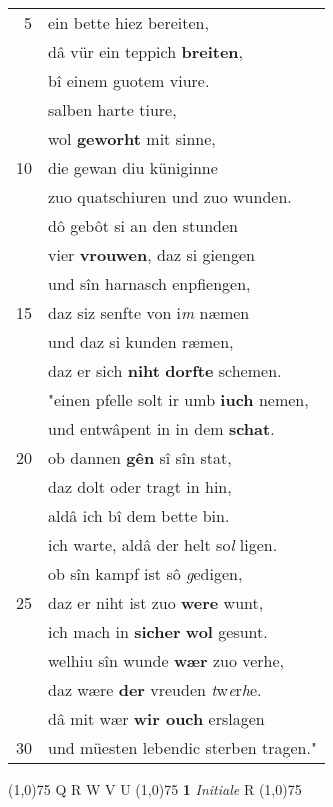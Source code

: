 \documentclass[8pt,a4paper,notitlepage]{article}
\begin{document}
\begin{table}[ht]
\begin{minipage}[t]{0.5\linewidth}
\begin{tabular}{rl}
5 & ein bette hiez bereiten,\\ 
 & dâ vür ein teppich \textbf{breiten},\\ 
 & bî einem guotem viure.\\ 
 & salben harte tiure,\\ 
 & wol \textbf{geworht} mit sinne,\\ 
10 & die gewan diu küniginne\\ 
 & zuo quatschiuren und zuo wunden.\\ 
 & dô gebôt si an den stunden\\ 
 & vier \textbf{vrouwen}, daz si giengen\\ 
 & und sîn harnasch enpfiengen,\\ 
15 & daz siz senfte von i\textit{m} næmen\\ 
 & und daz si kunden ræmen,\\ 
 & daz er sich \textbf{niht} \textbf{dorfte} schemen.\\ 
 & "einen pfelle solt ir umb \textbf{iuch} nemen,\\ 
 & und entwâpent in in dem \textbf{schat}.\\ 
20 & ob dannen \textbf{gên} sî sîn stat,\\ 
 & daz dolt oder tragt in hin,\\ 
 & aldâ ich bî dem bette bin.\\ 
 & ich warte, aldâ der helt so\textit{l} ligen.\\ 
 & ob sîn kampf ist sô \textit{g}edigen,\\ 
25 & daz er niht ist zuo \textbf{were} wunt,\\ 
 & ich mach in \textbf{sicher} \textbf{wol} gesunt.\\ 
 & welhiu sîn wunde \textbf{wær} zuo verhe,\\ 
 & daz wære \textbf{der} vreuden \textit{t}w\textit{e}r\textit{h}e.\\ 
 & dâ mit wær \textbf{wir ouch} erslagen\\ 
30 & und müesten lebendic sterben tragen."\\ 
\end{tabular}
\scriptsize
\line(1,0){75} \newline
Q R W V U \newline
\line(1,0){75} \newline
\textbf{1} \textit{Initiale} R  \newline
\line(1,0){75} \newline

\end{minipage}
\end{table}
\end{document}
